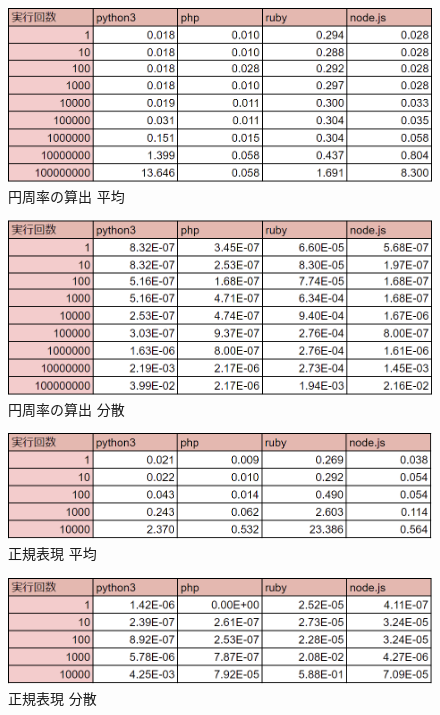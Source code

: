\clearpage

\begin{figure}[tb]
    \centering
    \includegraphics[width=14.5cm,keepaspectratio]{figure/p-average.PNG}
    \caption{円周率の算出 平均}
    \label{fig:p-average}
\end{figure}

\begin{figure}[tb]
    \centering
    \includegraphics[width=14.5cm,keepaspectratio]{figure/p-dispersion.PNG}
    \caption{円周率の算出 分散}
    \label{fig:p-dispersion}
\end{figure}

\clearpage

\begin{figure}[tb]
    \centering
    \includegraphics[width=14.5cm,keepaspectratio]{figure/s-average.PNG}
    \caption{正規表現 平均}
    \label{fig:s-average}
\end{figure}

\begin{figure}[tb]
    \centering
    \includegraphics[width=14.5cm,keepaspectratio]{figure/s-dispersion.PNG}
    \caption{正規表現 分散}
    \label{fig:s-dispersion}
\end{figure}
